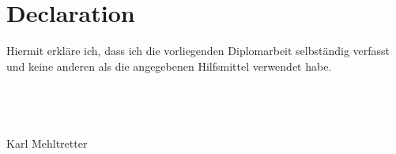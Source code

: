 \chapter*{Declaration}
Hiermit erkl\"are ich, dass ich die vorliegenden Diplomarbeit selbst\"andig verfasst und keine anderen als die angegebenen Hilfsmittel verwendet habe.
\\
\\
\\
\\
\\
{\Large Karl Mehltretter}\\